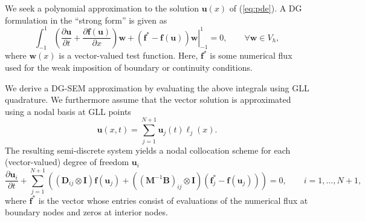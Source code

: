 \documentclass[preprint,10pt]{elsarticle}
\theoremstyle{definition}
\theoremstyle{lemma}
\theoremstyle{theorem}
\theoremstyle{assumption}
\newcommand{\pd}[2]{\frac{\partial#1}{\partial#2}}
\newcommand{\LRp}[1]{\left( #1 \right)}
\begin{document}
We seek a polynomial approximation to the solution $\bm{u}(x)$ of (\ref{eq:pde}).  A DG formulation in the ``strong form'' \cite{hesthaven2007nodal} is given as
\[
\int_{-1}^1\LRp{ \pd{\bm{u}}{t} + \pd{\bm{f}(\bm{u})}{x}}\bm{w} + \left.\LRp{\bm{f}^* - \bm{f}(\bm{u})} \bm{w}\right|_{-1}^1 = 0, \qquad \forall \bm{w}\in V_h,
\]
where $\bm{w}(x)$ is a vector-valued test function.
Here, $\bm{f}^*$ is some numerical flux used for the weak imposition of boundary or continuity conditions.  

We derive a DG-SEM approximation by evaluating the above integrals using GLL quadrature.  We furthermore assume that the vector solution is approximated using a nodal basis at GLL points 
\[
\bm{u}(x,t) = \sum_{j=1}^{N+1} \bm{u}_j(t)\ell_j(x).  
\]
The resulting semi-discrete system yields a nodal collocation scheme for each (vector-valued) degree of freedom $\bm{u}_i$ 
\[
\pd{\bm{u}_i}{t} + \sum_{j=1}^{N+1}\LRp{\LRp{\bm{D}_{ij}\otimes \bm{I}}\bm{f}(\bm{u}_j) +\LRp{\LRp{\bm{M}^{-1}\bm{B}}_{ij}\otimes \bm{I} }(\bm{f}_j^* - \bm{f}(\bm{u}_j))} = 0, \qquad i = 1,\ldots,N+1,
\]
where $\bm{f}^*$ is the vector whose entries consist of evaluations of the numerical flux at boundary nodes and zeros at interior nodes.  
\end{document}
